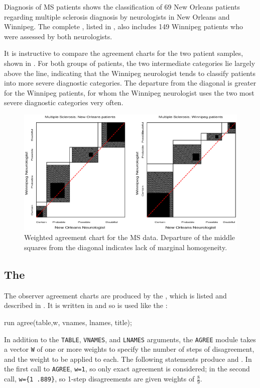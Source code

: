 \begin{Example}[MS2]{Diagnosis of MS patients}
 shows the classification of
69 New Orleans patients regarding multiple sclerosis diagnosis by
neurologists in New Orleans and Winnipeg.  The complete \Dset,
listed in , also includes 149 Winnipeg patients who
were assessed by both neurologists.

It is instructive to compare the agreement charts for the two patient
samples, shown in
.
For both groups of patients,
the two intermediate categories lie largely above the line,
indicating that the Winnipeg neurologist tends to classify patients
into more severe diagnostic categories.
The departure from the diagonal is greater for the Winnipeg patients,
for whom the Winnipeg neurologist uses the two most severe diagnostic
categories very often.

\begin{figure}[htb]
  \centering
  \includegraphics[width=1\linewidth,clip]{ch3/fig/agree2}
  \caption[Weighted agreement chart]{Weighted agreement chart for the MS data.  Departure of the middle squares from the diagonal indicates lack of marginal homogeneity.}\label{fig:agree2}
\end{figure}
\end{Example}

\subsection{The }
The observer agreement charts are produced by the ,
which is listed and described in .
It is written in \IML{} and so is used like the :
\begin{listing}
run agree(table,w, vnames, lnames, title);
\end{listing}

In addition to the \texttt{TABLE}, \texttt{VNAMES}, and \texttt{LNAMES}
arguments,
the \texttt{AGREE} module takes a vector \texttt{W} of one or more weights
to specify the number of steps of disagreement, and the weight to be
applied to each.
The following statements produce  and
.
In the first call to \texttt{AGREE}, \texttt{w=1}, so only exact
agreement is considered; in the second call, \texttt{w=\{1 .889\}},
so 1-step disagreements are given weights of $\frac89$.

